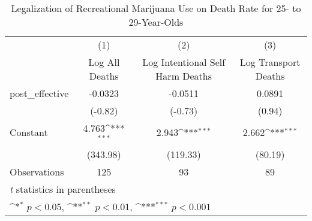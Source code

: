\begin{table}[htbp]\centering
\def\sym#1{\ifmmode^{#1}\else\(^{#1}\)\fi}
\caption{Legalization of Recreational Marijuana Use on Death Rate for 25- to 29-Year-Olds}
\begin{tabular}{l*{3}{c}}
\hline\hline
                    &\multicolumn{1}{c}{(1)}&\multicolumn{1}{c}{(2)}&\multicolumn{1}{c}{(3)}\\
                    &\multicolumn{1}{c}{Log All Deaths}&\multicolumn{1}{c}{Log Intentional Self Harm Deaths}&\multicolumn{1}{c}{Log Transport Deaths}\\
\hline
post\_effective      &     -0.0323         &     -0.0511         &      0.0891         \\
                    &     (-0.82)         &     (-0.73)         &      (0.94)         \\
[1em]
Constant            &       4.763\sym{***}&       2.943\sym{***}&       2.662\sym{***}\\
                    &    (343.98)         &    (119.33)         &     (80.19)         \\
\hline
Observations        &         125         &          93         &          89         \\
\hline\hline
\multicolumn{4}{l}{\footnotesize \textit{t} statistics in parentheses}\\
\multicolumn{4}{l}{\footnotesize \sym{*} \(p<0.05\), \sym{**} \(p<0.01\), \sym{***} \(p<0.001\)}\\
\end{tabular}
\end{table}
